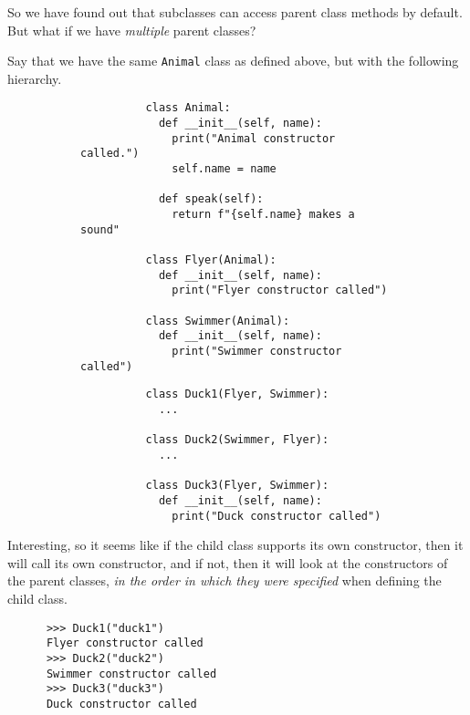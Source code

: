   So we have found out that subclasses can access parent class methods by default. But what if we have \textit{multiple} parent classes?  

  \begin{example}
    Say that we have the same \texttt{Animal} class as defined above, but with the following hierarchy. 

    \begin{figure}[H]
      \centering
      \begin{subfigure}[b]{0.48\textwidth}
        \centering
        \begin{lstlisting}
          class Animal: 
            def __init__(self, name):
              print("Animal constructor called.")
              self.name = name
            
            def speak(self):
              return f"{self.name} makes a sound"  

          class Flyer(Animal):  
            def __init__(self, name): 
              print("Flyer constructor called") 

          class Swimmer(Animal): 
            def __init__(self, name): 
              print("Swimmer constructor called") 
        \end{lstlisting}
        \caption{}
      \end{subfigure}
      \hfill 
      \begin{subfigure}[b]{0.48\textwidth}
        \centering
        \begin{lstlisting}
          class Duck1(Flyer, Swimmer): 
            ... 

          class Duck2(Swimmer, Flyer): 
            ...

          class Duck3(Flyer, Swimmer): 
            def __init__(self, name): 
              print("Duck constructor called")
        \end{lstlisting}
        \caption{}
      \end{subfigure}
      \caption{}
    \end{figure}

    Interesting, so it seems like if the child class supports its own constructor, then it will call its own constructor, and if not, then it will look at the constructors of the parent classes, \textit{in the order in which they were specified} when defining the child class. 
      
    \begin{lstlisting}
      >>> Duck1("duck1")
      Flyer constructor called
      >>> Duck2("duck2")
      Swimmer constructor called
      >>> Duck3("duck3")
      Duck constructor called
    \end{lstlisting} 
  \end{example} 

